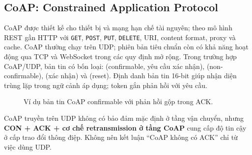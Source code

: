\subsection{CoAP: Constrained Application Protocol}
CoAP được thiết kế cho thiết bị và mạng hạn chế tài nguyên; theo mô hình REST gần HTTP với \texttt{GET}, \texttt{POST}, \texttt{PUT}, \texttt{DELETE}, URI, content format, proxy và cache. CoAP thường chạy trên UDP; phiên bản tiêu chuẩn còn có khả năng hoạt động qua TCP và WebSocket trong các quy định mở rộng. Trong trường hợp CoAP/UDP, bản tin có bốn loại:  (confirmable, yêu cầu xác nhận),  (non-confirmable),  (xác nhận) và  (reset). Định danh bản tin 16-bit giúp nhận diện trùng lặp trong ngữ cảnh áp dụng; token gắn phản hồi với yêu cầu.
\begin{figure}[htbp]\centering
{}\caption{Ví dụ bản tin CoAP confirmable với phản hồi gộp trong ACK.}
\end{figure}
\begin{keybox}CoAP truyền trên UDP không có bảo đảm mặc định ở tầng vận chuyển, nhưng \textbf{CON + ACK + cơ chế retransmission ở tầng CoAP} cung cấp độ tin cậy ở cấp trao đổi thông điệp. Không nên kết luận ``CoAP không có ACK'' chỉ từ việc dùng UDP.\end{keybox}
